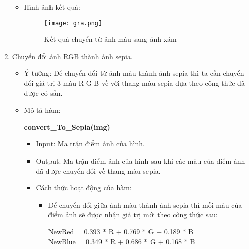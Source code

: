 \documentclass{report}
\begin{document}
\begin{enumerate}
\begin{itemize}
\begin{itemize}
\begin{itemize}
                        \end{itemize}
                    \end{itemize}
                \pagebreak
                \item Hình ảnh kết quả:
                \begin{figure}[!h]
                    \centering
                    \texttt{[image: gra.png]}
                    \caption{Kết quả chuyển từ ảnh màu sang ảnh xám}
                \end{figure}
            \end{itemize}
        \item Chuyển đổi ảnh RGB thành ảnh sepia.
            \begin{itemize}
                \item Ý tưởng: Để chuyển đổi từ ảnh màu thành ảnh sepia thì ta cần chuyển đổi giá trị 3 màu R-G-B về với thang màu sepia dựa theo công thức đã được có sẵn.

                \item Mô tả hàm:
                    \begin{center}
                        \textbf{convert\_To\_Sepia(img)}
                    \end{center}
                    \begin{itemize}
                        \item Input: Ma trận điểm ảnh của hình.
                        \item Output: Ma trận điểm ảnh của hình sau khi các màu của điểm ảnh đã được chuyển đổi về thang màu sepia.
                        \item Cách thức hoạt động của hàm:
                            \begin{itemize}
                                \item Để chuyển đổi giữa ảnh màu thành ảnh sepia thì mỗi màu của điểm ảnh sẽ được nhận giá trị mới theo công thức sau:
                                \begin{center}
                                NewRed = 0.393 * R + 0.769 * G + 0.189 * B\\
                                    
                                NewBlue = 0.349 * R + 0.686 * G + 0.168 * B\\
                                    

\end{center}
\end{itemize}
\end{itemize}
\end{itemize}
\end{enumerate}
\end{document}
